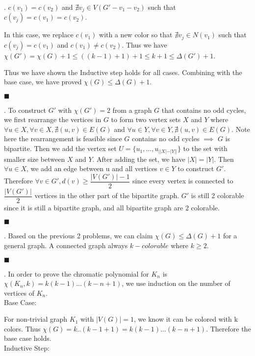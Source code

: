 \documentclass[12pt]{article}
\begin{document}
	 . $c(v_1) = c(v_2)$ and $\nexists v_j \in V(G'-v_1 - v_2)$ such that $c(v_j) = c(v_1) = c(v_2)$.
	 
	 In this case, we replace $c(v_1)$ with a new color so that $\nexists v_j \in N(v_1)$ such that $c(v_j) = c(v_1)$ and $c(v_1) \neq c(v_2)$. Thus we have $\chi(G') = \chi(G) + 1 \leq ((k-1)+1)+1 \leq k+1 \leq \Delta(G')+1$.
	 
	 \noindent Thus we have shown the Inductive step holds for all cases. Combining with the base case, we have proved $\chi(G) \leq \Delta(G) + 1$.
	 
	 	\hfill $\blacksquare$
	 	
	. To construct $G'$ with $\chi(G') = 2$ from a graph $G$ that contains no odd cycles, we first rearrange the vertices in $G$ to form two vertex sets $X$ and $Y$ where $\forall u \in X, \forall v \in X, \nexists (u,v) \in E(G)$ and $\forall u \in Y, \forall v \in Y, \nexists (u,v) \in E(G)$. Note here the rearrangement is feasible since $G$ contains no odd cycles $\implies$ $G$ is bipartite. Then we add the vertex set $U = \{u_1,...,u_{||X|-|Y||}\}$ to the set with smaller size between $X$ and $Y$.
	After adding the set, we have $|X| = |Y|$. Then $\forall u \in X$, we add an edge between u and all vertices $v \in Y$ to construct $G'$. Therefore $\forall v \in G', d(v) \geq \dfrac{|V(G')|-1}{2}$ since every vertex is connected to $\dfrac{|V(G')|}{2}$ vertices in the other part of the bipartite graph. $G'$ is still 2 colorable since it is still a bipartite graph, and all bipartite graph are $2$ colorable.
	
	\hfill $\blacksquare$
	
	. Based on the previous 2 problems, we can claim $\chi(G) \leq \Delta(G) + 1$ for a general graph. A connected graph always $k-colorable$ where $k \geq 2$.
	
	\hfill $\blacksquare$
	
	. In order to prove the chromatic polynomial for $K_n$ is $\chi(K_n, k) = k(k-1)\ldots(k-n+1)$, we use induction on the number of vertices of $K_n$.\\
	
	\noindent Base Case:
	
	For non-trivial graph $K_1$ with $|V(G)| = 1$, we know it can be colored with k colors. Thus $\chi(G) = k..(k-1+1) = k(k-1)\ldots(k-n+1)$. Therefore the base case holds.\\
	
	\noindent Inductive Step:
	
\end{document}
